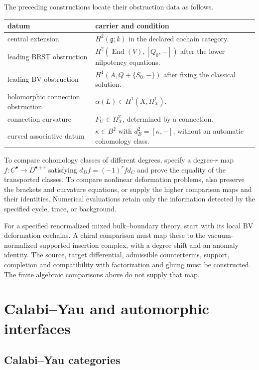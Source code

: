 The preceding constructions locate their obstruction data as follows.
\begin{center}
\begin{tabularx}{\textwidth}{@{}p{}X@{}}
\toprule
datum&carrier and condition\\ \midrule
central extension&$H^2(\mathfrak g;k)$ in the declared cochain category.\\
leading BRST obstruction&$H^2(\operatorname{End}(V),[Q_0,-])$ after the lower nilpotency equations.\\
leading BV obstruction&$H^1(A,Q+\{S_0,-\})$ after fixing the classical solution.\\
holomorphic connection obstruction&$\alpha(L)\in H^1(X,\Omega_X^1)$.\\
connection curvature&$F_\nabla\in\Omega_X^2$, determined by a connection.\\
curved associative datum&$\kappa\in B^2$ with $d_B^2=[\kappa,-]$, without an automatic cohomology class.\\
\bottomrule
\end{tabularx}
\end{center}

To compare cohomology classes of different degrees, specify a degree-$r$ map $f:C^\bullet\to D^{\bullet+r}$ satisfying $d_Df=(-1)^rfd_C$ and prove the equality of the transported classes.
To compare nonlinear deformation problems, also preserve the brackets and curvature equations, or supply the higher comparison maps and their identities.
Numerical evaluations retain only the information detected by the specified cycle, trace, or background.

For a specified renormalized mixed bulk--boundary theory, start with its local BV deformation cochains.
A chiral comparison must map these to the vacuum-normalized supported insertion complex, with a degree shift and an anomaly identity.
The source, target differential, admissible counterterms, support, completion and compatibility with factorization and gluing must be constructed.
The finite algebraic comparisons above do not supply that map.

\part{Calabi--Yau and automorphic interfaces}

\chapter{Calabi--Yau categories}\label{cbc:cy:chapter}

